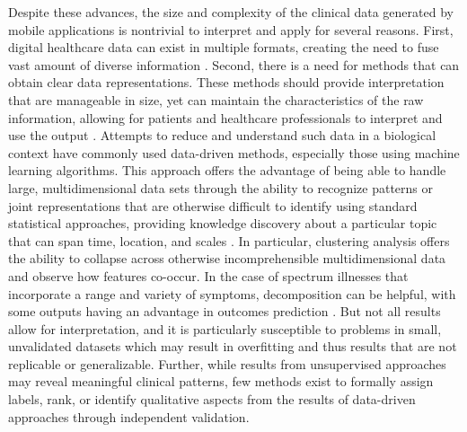 \documentclass[conference]{IEEEtran}
\begin{document}
Despite these advances, the size and complexity of the clinical data generated by mobile applications is nontrivial to interpret and apply for several reasons. First, digital healthcare data can exist in multiple formats, creating the need to fuse vast amount of diverse information \cite{Yu2019}. Second, there is a need for methods that can obtain clear data representations. These methods should provide interpretation that are manageable in size, yet can maintain the characteristics of the raw information, allowing for patients and healthcare professionals to interpret and use the output \cite{Ambigavathi2018}. Attempts to reduce and understand such data in a biological context have commonly used data-driven methods, especially those using machine learning algorithms. This approach offers the advantage of being able to handle large, multidimensional data sets through the ability to recognize patterns or joint representations that are otherwise difficult to identify using standard statistical approaches, providing knowledge discovery about a particular topic that can span time, location, and scales \cite{Dinov2016}. In particular, clustering analysis offers the ability to collapse across otherwise incomprehensible multidimensional data and observe how features co-occur. In the case of spectrum illnesses that incorporate a range and variety of symptoms, decomposition can be helpful, with some outputs having an advantage in outcomes prediction \cite{Reinen2018}. But not all results allow for interpretation, and it is particularly susceptible to problems in small, unvalidated datasets which may result in overfitting and thus results that are not replicable or generalizable. Further, while results from unsupervised approaches may reveal meaningful clinical patterns, few methods exist to formally assign labels, rank, or identify qualitative aspects from the results of data-driven approaches through independent validation. 
\end{document}
